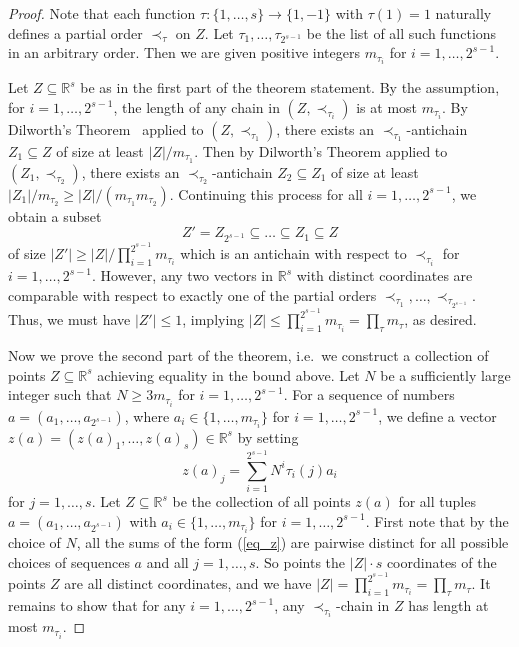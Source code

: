 \documentclass[11pt]{article}
\theoremstyle{definition}
\numberwithin{equation}{section}
\numberwithin{figure}{section}
\newcommand{\su}{\subseteq}
\begin{document}
\begin{proof}
Note that each function $\tau:\{1, \ldots, s\}\rightarrow \{1,-1\}$ with $\tau(1) = 1$ naturally defines a partial order $\prec_{\tau}$ on $Z$. Let $\tau_1, \ldots, \tau_{2^{s-1}}$ be the list of all such functions in an arbitrary order. Then we are given positive integers $m_{\tau_i}$ for $i=1,\dots,2^{s-1}$.

Let $Z \subseteq \mathbb R^s$ be as in the first part of the theorem statement. By the assumption, for $i=1,\dots,2^{s-1}$, the length of any chain in $(Z, \prec_{\tau_i})$ is at most $m_{\tau_i}$. 
 By Dilworth's Theorem~\cite{Dil} applied to $(Z, \prec_{\tau_1})$, there exists an $\prec_{\tau_1}$-antichain $Z_1 \subseteq Z$ of size at least $|Z| / m_{\tau_1}$. Then by Dilworth's Theorem applied to $(Z_1, \prec_{\tau_2})$, there exists an $\prec_{\tau_2}$-antichain $Z_2 \subseteq Z_1$ of size at least $|Z_1| / m_{\tau_2} \ge |Z|/(m_{\tau_1}m_{\tau_2})$. Continuing this process for all $i=1, \ldots, 2^{s-1}$, we obtain a subset
\[Z' = Z_{2^{s-1}} \subseteq \ldots \subseteq Z_1\su Z\]
of size $|Z'|\ge |Z|/\prod_{i=1}^{2^{s-1}} m_{\tau_i}$ which is an antichain with respect to $\prec_{\tau_i}$ for $i=1,\dots,2^{s-1}$. However, any two vectors in $\mathbb R^s$ with distinct coordinates are comparable with respect to exactly one of the partial orders $\prec_{\tau_1},\dots,\prec_{\tau_{2^{s-1}}}$. Thus, we must have $|Z'|\le 1$, implying $|Z|\le \prod_{i=1}^{2^{s-1}} m_{\tau_i}=\prod_\tau m_{\tau}$, as desired. 

Now we prove the second part of the theorem, i.e.\ we construct a collection of points $Z\su \mathbb{R}^s$ achieving equality in the bound above. Let $N$ be a sufficiently large integer such that $N\ge 3m_{\tau_i}$ for $i=1,\dots,2^{s-1}$. For a sequence of numbers $a = (a_1, \ldots, a_{2^{s-1}})$, where $a_i \in \{1, \ldots, m_{\tau_i}\}$ for $i=1, \ldots, 2^{s-1}$, we define a vector $z(a) = (z(a)_1, \ldots, z(a)_s) \in \mathbb R^s$ by setting
\begin{equation}\label{eq_z}
z(a)_j = \sum_{i=1}^{2^{s-1}} N^{i} \tau_i(j) a_{i}
\end{equation}
for $j=1,\dots,s$. Let $Z \subseteq \mathbb R^s$ be the collection of all points $z(a)$ for all tuples $a = (a_1, \ldots, a_{2^{s-1}})$ with $a_i \in \{1, \ldots, m_{\tau_i}\}$ for $i=1, \ldots, 2^{s-1}$. First note that by the choice of $N$, all the sums of the form (\ref{eq_z}) are pairwise distinct for all possible choices of sequences $a$ and all $j=1,\dots,s$. So points the $|Z|\cdot s$ coordinates of the points $Z$ are all distinct coordinates, and we have $|Z| = \prod_{i=1}^{2^{s-1}} m_{\tau_i}=\prod_\tau m_\tau$. It remains to show that for any $i = 1, \ldots, 2^{s-1}$, any $\prec_{\tau_i}$-chain in $Z$ has length at most $m_{\tau_i}$. 


\end{proof}
\end{document}
